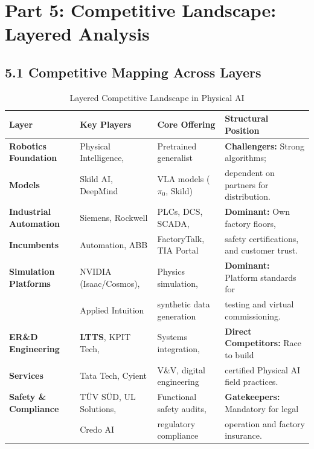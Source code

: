 \documentclass[11pt,a4paper]{article}
\begin{document}
\section{Part 5: Competitive Landscape: Layered Analysis}

\subsection{5.1 Competitive Mapping Across Layers}
\begin{table}[h!]
\centering
\small
\begin{tabularx}{\textwidth}{@{}l p{3.8cm} p{3.2cm} X@{}}
\toprule
\textbf{Layer} & \textbf{Key Players} & \textbf{Core Offering} & \textbf{Structural Position} \\
\midrule
\textbf{Robotics Foundation} & Physical Intelligence, & Pretrained generalist & \textbf{Challengers:} Strong algorithms; \\
\textbf{Models} & Skild AI, DeepMind & VLA models ($\pi_0$, Skild) & dependent on partners for distribution. \\
\addlinespace
\textbf{Industrial Automation} & Siemens, Rockwell & PLCs, DCS, SCADA, & \textbf{Dominant:} Own factory floors, \\
\textbf{Incumbents} & Automation, ABB & FactoryTalk, TIA Portal & safety certifications, and customer trust. \\
\addlinespace
\textbf{Simulation Platforms} & NVIDIA (Isaac/Cosmos), & Physics simulation, & \textbf{Dominant:} Platform standards for \\
& Applied Intuition & synthetic data generation & testing and virtual commissioning. \\
\addlinespace
\textbf{ER\&D Engineering} & \textbf{LTTS}, KPIT Tech, & Systems integration, & \textbf{Direct Competitors:} Race to build \\
\textbf{Services} & Tata Tech, Cyient & V\&V, digital engineering & certified Physical AI field practices. \\
\addlinespace
\textbf{Safety \& Compliance} & TÜV SÜD, UL Solutions, & Functional safety audits, & \textbf{Gatekeepers:} Mandatory for legal \\
& Credo AI & regulatory compliance & operation and factory insurance. \\
\bottomrule
\end{tabularx}
\caption{Layered Competitive Landscape in Physical AI}
\end{table}
\end{document}

